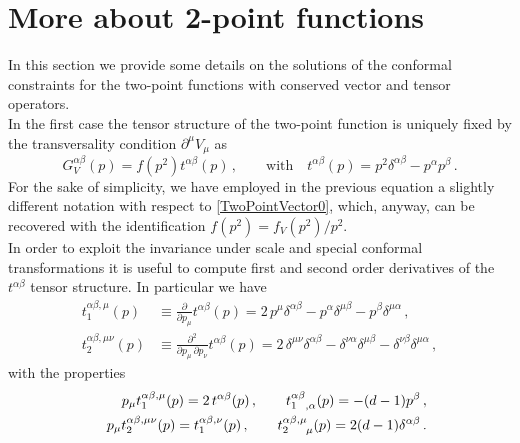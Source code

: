\documentclass[a4paper,11pt,openright,twoside]{book}
\numberwithin{equation}{section}
\begin{document}
\section{More about 2-point functions}
\label{AppTwoPoint}
%
In this section we provide some details on the solutions of the conformal constraints for the two-point functions with conserved vector and tensor operators. \\
%
In the first case the tensor structure of the two-point function is uniquely fixed by the transversality condition $\partial^\mu V_\mu$ as
\begin{equation}
	G_V^{\alpha \beta}(p) = f(p^2) t^{\alpha \beta}(p)\,, \qquad \mbox{with} \quad t^{\alpha\beta}(p) = p^2 \delta^{\alpha\beta} - p^{\alpha} p^{\beta} \,.
\end{equation}
For the sake of simplicity, we have employed in the previous equation a slightly different notation with respect to \eqref{TwoPointVector0}, which, anyway, can be recovered with the identification $f(p^2) = f_V(p^2)/p^2$. \\
In order to exploit the invariance under scale and special conformal transformations it is useful to compute first and second order derivatives of the $t^{\alpha \beta}$ tensor structure. In particular we have
\begin{equation}
	\label{TDerivatives}
	\begin{split}
		t_1^{\alpha \beta, \mu}(p) &\equiv \frac{\partial }{\partial p_\mu} t^{\alpha \beta}(p) = 2 \, p^{\mu} \delta^{\alpha \beta} - p^{\alpha} \delta^{\mu \beta} - p^{\beta} \delta^{\mu \alpha} \,,  \\
		t_2^{\alpha \beta, \mu \nu}(p) &\equiv \frac{\partial^2 }{\partial p_\mu \, \partial p_\nu} t^{\alpha \beta}(p) = 2 \, \delta^{\mu \nu} \delta^{\alpha \beta} - \delta^{\nu \alpha} \delta^{\mu \beta} - \delta^{\nu \beta} \delta^{\mu \alpha} \,, 
	\end{split}
\end{equation}
with the properties
\begin{eqnarray}
	&& p_\mu t_1^{\alpha \beta, \mu}(p) = 2 \, t^{\alpha \beta}(p) \,, \qquad     t^{\alpha \beta}_{1\hspace{0.22cm},\alpha}(p) = - (d - 1) p^\beta \,, \notag \\
	&& p_\mu t_2^{\alpha \beta, \mu \nu}(p) = t_1^{\alpha \beta, \nu}(p) \,, \qquad    t^{\alpha \beta, \mu}_{2\hspace{0.45cm} \mu}(p) = 2(d-1) \delta^{\alpha \beta} \,. 
\end{eqnarray}
\end{document}
